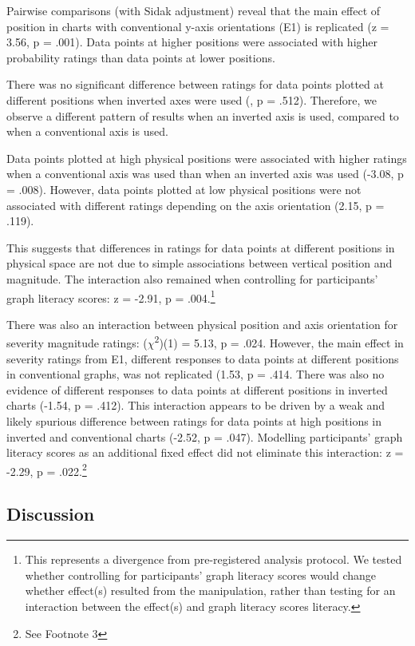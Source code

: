 \documentclass[journal]{vgtc}                %
\begin{document}
Pairwise comparisons (with Sidak adjustment) reveal that the main effect of position in charts with conventional y-axis orientations (E1) is replicated (z = 3.56, p = .001). Data points at higher positions were associated with higher probability ratings than data points at lower positions.

There was no significant difference between ratings for data points plotted at different positions when inverted axes were used (, p = .512). Therefore, we observe a different pattern of results when an inverted axis is used, compared to when a conventional axis is used.

Data points plotted at high physical positions were associated with higher ratings when a conventional axis was used than when an inverted axis was used (-3.08, p = .008). However, data points plotted at low physical positions were not associated with different ratings depending on the axis orientation (2.15, p = .119).

This suggests that differences in ratings for data points at different positions in physical space are not due to simple associations between vertical position and magnitude. The interaction also remained when controlling for participants' graph literacy scores: z = -2.91, p = .004.\footnote{This represents a divergence from pre-registered analysis protocol. We tested whether controlling for participants' graph literacy scores would change whether effect(s) resulted from the manipulation, rather than testing for an interaction between the effect(s) and graph literacy scores literacy.}

There was also an interaction between physical position and axis orientation for severity magnitude ratings: (\(\chi\)\textsuperscript{2})(1) = 5.13, p = .024. However, the main effect in severity ratings from E1, different responses to data points at different positions in conventional graphs, was not replicated (1.53, p = .414. There was also no evidence of different responses to data points at different positions in inverted charts (-1.54, p = .412). This interaction appears to be driven by a weak and likely spurious difference between ratings for data points at high positions in inverted and conventional charts (-2.52, p = .047). Modelling participants' graph literacy scores as an additional fixed effect did not eliminate this interaction: z = -2.29, p = .022.\footnote{See Footnote 3}

\hypertarget{discussion-1}{%
\subsection{Discussion}\label{discussion-1}}
\end{document}
